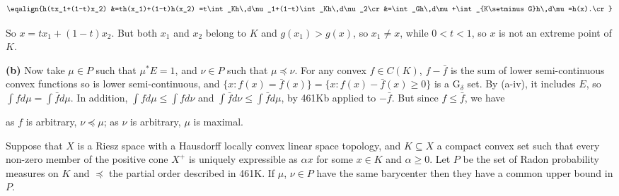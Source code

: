 {$$\eqalign{h(tx_1+(1-t)x_2)
&=th(x_1)+(1-t)h(x_2)
=t\int_Kh\,d\nu_1+(1-t)\int_Kh\,d\nu_2\cr
&=\int_Gh\,d\mu+\int_{K\setminus G}h\,d\mu
=h(x).\cr}$$

\noindent So $x=tx_1+(1-t)x_2$.    But both $x_1$ and $x_2$ belong to $K$
and $g(x_1)>g(x)$, so $x_1\ne x$, while $0<t<1$, so $x$ is not an extreme
point of $K$.\ \Qed


\medskip

{\bf (b)} Now take $\mu\in P$ such that $\mu^*E=1$, and $\nu\in P$ such that
$\mu\preccurlyeq\nu$.   For any convex
$f\in C(K)$, $f-\bar f$ is the sum of lower semi-continuous convex functions
so is lower semi-continuous, and
$\{x:f(x)=\bar f(x)\}=\{x:f(x)-\bar f(x)\ge 0\}$ is a G$_{\delta}$ set.
By (a-iv), it includes $E$, so $\int fd\mu=\int\bar fd\mu$.
In addition, $\int fd\mu\le\int fd\nu$ and
$\int\bar fd\nu\le\int\bar fd\mu$, by 461Kb applied to $-\bar f$.
But since $f\le\bar f$, we have


\noindent as $f$ is arbitrary, $\nu\preccurlyeq\mu$;
as $\nu$ is arbitrary, $\mu$ is maximal.
}%

 Suppose that $X$ is a Riesz space with a Hausdorff
locally convex linear space topology, and $K\subseteq X$ a
compact convex set such that every non-zero member of the positive cone
$X^+$ is uniquely expressible as $\alpha x$ for some $x\in K$ and
$\alpha\ge 0$.
Let $P$ be the set of Radon probability measures on $K$ and $\preccurlyeq$
the partial order described in 461K.   If $\mu$, $\nu\in P$ have the same
barycenter then they have a common upper bound in $P$.

